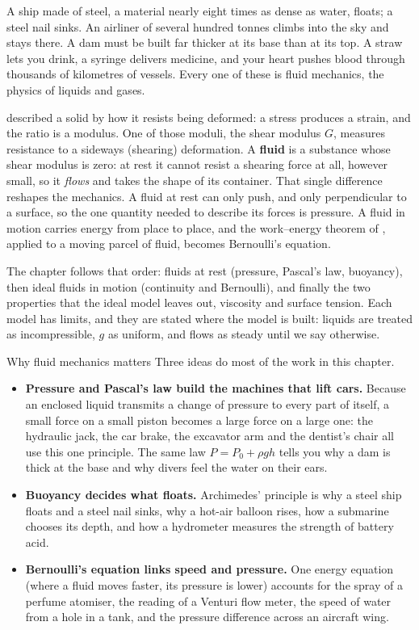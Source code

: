 
A ship made of steel, a material nearly eight times as dense as water, floats; a steel nail sinks. An
airliner of several hundred tonnes climbs into the sky and stays there. A dam must be built far thicker at
its base than at its top. A straw lets you drink, a syringe delivers medicine, and your heart pushes blood
through thousands of kilometres of vessels. Every one of these is fluid mechanics, the physics of liquids
and gases.

 described a solid by how it resists being deformed: a stress produces a strain, and the
ratio is a modulus. One of those moduli, the shear modulus $G$, measures resistance to a sideways
(shearing) deformation. A \textbf{fluid} is a substance whose shear modulus is zero: at rest it cannot
resist a shearing force at all, however small, so it \emph{flows} and takes the shape of its container.
That single difference reshapes the mechanics. A fluid at rest can only push, and only perpendicular to a
surface, so the one quantity needed to describe its forces is pressure. A fluid in motion carries energy
from place to place, and the work--energy theorem of , applied to a moving parcel of fluid,
becomes Bernoulli's equation.

The chapter follows that order: fluids at rest (pressure, Pascal's law, buoyancy), then ideal fluids in
motion (continuity and Bernoulli), and finally the two properties that the ideal model leaves out,
viscosity and surface tension. Each model has limits, and they are stated where the model is built: liquids
are treated as incompressible, $g$ as uniform, and flows as steady until we say otherwise.

\begin{motivbox}{Why fluid mechanics matters}
Three ideas do most of the work in this chapter.
\begin{itemize}
\item \textbf{Pressure and Pascal's law build the machines that lift cars.} Because an enclosed liquid
transmits a change of pressure to every part of itself, a small force on a small piston becomes a large
force on a large one: the hydraulic jack, the car brake, the excavator arm and the dentist's chair all use
this one principle. The same law $P=P_0+\rho gh$ tells you why a dam is thick at the base and why divers
feel the water on their ears.
\item \textbf{Buoyancy decides what floats.} Archimedes' principle is why a steel ship floats and a steel
nail sinks, why a hot-air balloon rises, how a submarine chooses its depth, and how a hydrometer measures
the strength of battery acid.
\item \textbf{Bernoulli's equation links speed and pressure.} One energy equation (where a fluid moves
faster, its pressure is lower) accounts for the spray of a perfume atomiser, the reading of a Venturi
flow meter, the speed of water from a hole in a tank, and the pressure difference across an aircraft wing.
\end{itemize}
\end{motivbox}

